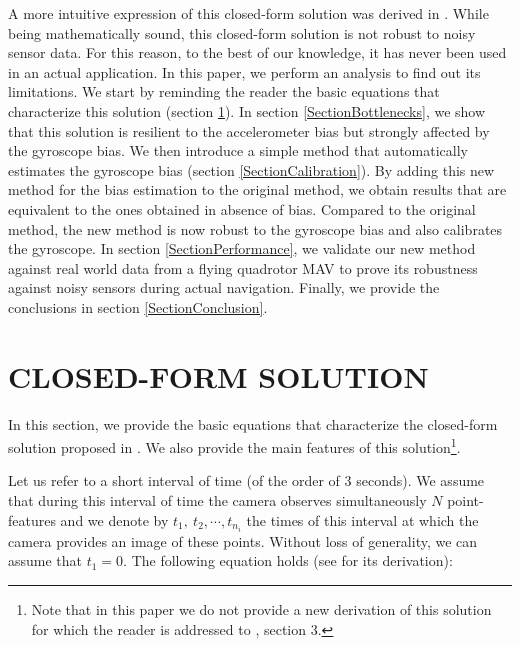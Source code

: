 \documentclass[letterpaper, 10 pt, journal, final]{ieeeconf}  %
\begin{document}
A more intuitive expression of this closed-form solution was derived in \cite{Martinelli2014}.
While being mathematically sound, this closed-form solution is not robust to noisy sensor data.
For this reason, to the best of our knowledge, it has never been used in an actual application.
In this paper, we perform an analysis to find out its limitations. We start by reminding the reader the basic equations that characterize this solution (section \ref{SectionCFS}).
In section \ref{SectionBottlenecks}, we show that this solution is resilient to the accelerometer bias but strongly affected by the gyroscope bias.
We then introduce a simple method that automatically estimates the gyroscope bias (section \ref{SectionCalibration}).
By adding this new method for the bias estimation to the original method, we obtain results that are equivalent to the ones obtained in absence of bias.
Compared to the original method, the new method is now robust to the gyroscope bias and also calibrates the gyroscope.
In section \ref{SectionPerformance}, we validate our new method against real world data from a flying quadrotor MAV to prove its robustness against noisy sensors during actual navigation.
Finally, we provide the conclusions in section \ref{SectionConclusion}.

\section{CLOSED-FORM SOLUTION}\label{SectionCFS}

In this section, we provide the basic equations that characterize the closed-form solution proposed in  \cite{Martinelli2014}. We also provide the main features of this solution\footnote{Note that in this paper we do not provide a new derivation of this solution for which the reader is addressed to \cite{Martinelli2014}, section 3.}.

Let us refer to a short interval of time (of the order of $3$ seconds). We assume that during this interval of time the camera observes simultaneously $N$ point-features and we denote by $t_1,~t_2,\cdots,t_{n_i}$ the times of this interval at which the camera provides an image of these points. Without loss of generality, we can assume that $t_1=0$.
The following equation holds (see \cite{Martinelli2014} for its derivation):
\end{document}
